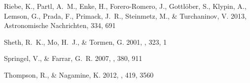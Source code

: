\documentclass{emulateapj}
\begin{document}
\begin{thebibliography}{28}
{Riebe}, K., {Partl}, A.~M., {Enke}, H., {Forero-Romero}, J., {Gottl{\"o}ber},
  S., {Klypin}, A., {Lemson}, G., {Prada}, F., {Primack}, J.~R., {Steinmetz},
  M., \& {Turchaninov}, V. 2013, Astronomische Nachrichten, 334, 691

{Sheth}, R.~K., {Mo}, H.~J., \& {Tormen}, G. 2001, \mnras, 323, 1

{Springel}, V., \& {Farrar}, G.~R. 2007, \mnras, 380, 911

{Thompson}, R., \& {Nagamine}, K. 2012, \mnras, 419, 3560

\end{thebibliography}
\end{document}
